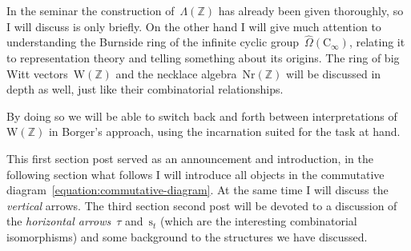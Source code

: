 In the seminar the construction of~$\Lambda(\mathbb{Z})$ has already been given thoroughly, so I will discuss is only briefly. On the other hand I will give much attention to understanding the Burnside ring of the infinite cyclic group~$\hat{\Omega}(\mathrm{C}_\infty)$, relating it to representation theory and telling something about its origins. The ring of big Witt vectors~$\mathrm{W}(\mathbb{Z})$ and the necklace algebra~$\mathrm{Nr}(\mathbb{Z})$ will be discussed in depth as well, just like their combinatorial relationships.

By doing so we will be able to switch back and forth between interpretations of~$\mathrm{W}(\mathbb{Z})$ in Borger's approach, using the incarnation suited for the task at hand.

This first \iftex section \fi\ifblog post \fi served as an announcement and introduction, in \iftex the following section \fi\ifblog what follows \fi I will introduce all objects in the commutative diagram~\eqref{equation:commutative-diagram}. At the same time I will discuss the \emph{vertical} arrows. The \iftex third section \fi\ifblog second post \fi will be devoted to a discussion of the \emph{horizontal arrows}~$\tau$ and~$\mathrm{s}_t$ (which are the interesting combinatorial isomorphisms) and some background to the structures we have discussed.

